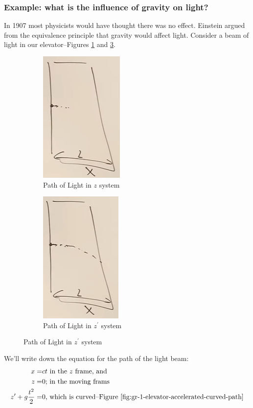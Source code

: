 \documentclass[]{article}
\begin{document}
\subsubsection{Example: what is the influence of gravity on light?}
In 1907 most physicists would have thought there was no effect. Einstein argued from the equivalence principle that gravity would affect light. Consider a beam of light in our elevator--Figures \ref{fig:gr-1-light-in-elevator} and \ref{fig:gr-1-elevator-accelerated-curved-path}.

\begin{figure}[H]
	\caption{What is the influence of gravity on light? }
	\begin{subfigure}[t]{0.5\textwidth}
		\caption{Path of Light in $z$ system}\label{fig:gr-1-light-in-elevator}
		\includegraphics{gr-1-light-in-elevator}
	\end{subfigure}
	\begin{subfigure}[t]{0.5\textwidth}
		\caption{Path of Light in $z^\prime$ system}\label{fig:gr-1-elevator-accelerated-curved-path}
		\includegraphics{gr-1-elevator-accelerated-curved-path}
	\end{subfigure}
\end{figure}

We'll write down the equation for the path of the light beam:
\begin{align*}
	x =& ct \text{ in the $z$ frame, and}\\
	z =& 0 \text{; in the moving frams}\\
	z^\prime + g\frac{t^2}{2} =&0 \text{, which is curved--Figure \ref{fig:gr-1-elevator-accelerated-curved-path}}
\end{align*}
\end{document}
